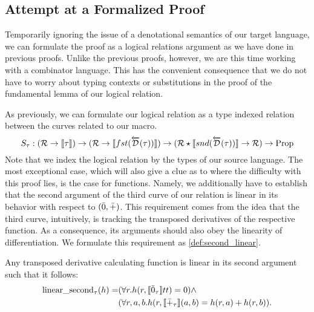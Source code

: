 \subsection{Attempt at a Formalized Proof}\label{sec:combinator-proof}
  Temporarily ignoring the issue of a denotational semantics of our target language, we can formulate the proof as a logical relations argument as we have done in previous proofs.
  Unlike the previous proofs, however, we are this time working with a combinator language.
  This has the convenient consequence that we do not have to worry about typing contexts or substitutions in the proof of the fundamental lemma of our logical relation.

  As previously, we can formulate our logical relation as a type indexed relation between the curves related to our macro.
  \begin{equation*}
    S_\tau : (\mathcal{R} \rightarrow \llbracket \tau \rrbracket) \rightarrow
      (\mathcal{R} \rightarrow \llbracket fst (\overleftarrow{\mathcal{D}}(\tau)) \rrbracket) \rightarrow
      (\mathcal{R} \star \llbracket snd(\overleftarrow{\mathcal{D}}(\tau)) \rrbracket \rightarrow \mathcal{R}) \rightarrow \text{Prop}
  \end{equation*}
  Note that we index the logical relation by the types of our source language.
  The most exceptional case, which will also give a clue as to where the difficulty with this proof lies, is the case for functions.
  Namely, we additionally have to establish that the second argument of the third curve of our relation is linear in its behavior with respect to $(\bar{0}, \bar{+})$.
  This requirement comes from the idea that the third curve, intuitively, is tracking the transposed derivatives of the respective function.
  As a consequence, its arguments should also obey the linearity of differentiation. We formulate this requirement as \cref{def:second_linear}.

  \begin{definition}\label{def:second_linear}
    Any transposed derivative calculating function is linear in its second argument such that it follows:
    \begin{align*}
      \text{linear\_second}_\tau(h) =& (\forall r. h(r, \llbracket \bar{0}_\tau \rrbracket tt) = 0) \wedge \\ & (\forall r, a, b. h(r, \llbracket \bar{+}_\tau \rrbracket (a, b) = h (r, a) + h (r, b)).
    \end{align*}
  \end{definition}

